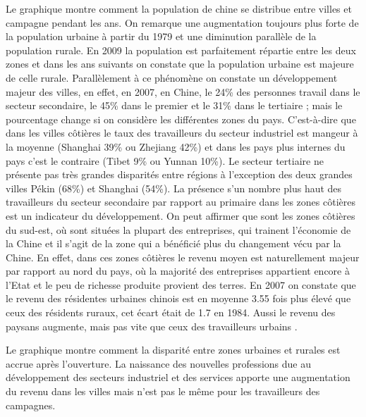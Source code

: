 Le graphique montre comment la population de chine se distribue entre villes et campagne pendant les ans. On remarque une augmentation toujours plus forte de la population urbaine à partir du 1979 et une diminution parallèle de la population rurale. En 2009 la population est parfaitement répartie entre les deux zones et dans les ans suivants on constate que la population urbaine est majeure de celle rurale.
Parallèlement à ce phénomène on constate un développement majeur des villes, en effet, en 2007, en Chine, le 24\% des personnes travail dans le secteur secondaire, le 45\% dans le premier et le 31\% dans le tertiaire ; mais le pourcentage change si on considère les différentes zones du pays.  C’est-à-dire que dans les villes côtières le taux des travailleurs du secteur industriel est mangeur à la moyenne (Shanghai 39\% ou Zhejiang 42\%) et dans les pays plus internes du pays c’est le contraire (Tibet 9\% ou Yunnan 10\%). Le secteur tertiaire ne présente pas très grandes disparités entre régions à l’exception des deux grandes villes Pékin (68\%) et Shanghai (54\%).  La présence s’un nombre plus haut des travailleurs du secteur secondaire par rapport au primaire dans les zones côtières est un indicateur du développement. 
On peut affirmer que sont les zones côtières du sud-est, où sont situées la plupart des entreprises, qui trainent l’économie de la Chine et il s’agit de la zone qui a bénéficié plus du changement vécu par la Chine.  En effet, dans ces zones côtières le revenu moyen est naturellement majeur par rapport au nord du pays, où la majorité des entreprises appartient encore à l’Etat et le peu de richesse produite provient des terres.  En 2007 on constate que le revenu des résidentes urbaines chinois est en moyenne 3.55 fois plus élevé que ceux des résidents ruraux, cet écart était de 1.7 en 1984.  Aussi le revenu des paysans augmente, mais pas vite que ceux des travailleurs urbains .

Le graphique montre comment la disparité entre zones urbaines et rurales est accrue après l’ouverture. La naissance des nouvelles professions due au développement des secteurs industriel et des services apporte une augmentation du revenu dans les villes mais n’est pas le même pour les travailleurs des campagnes. 

